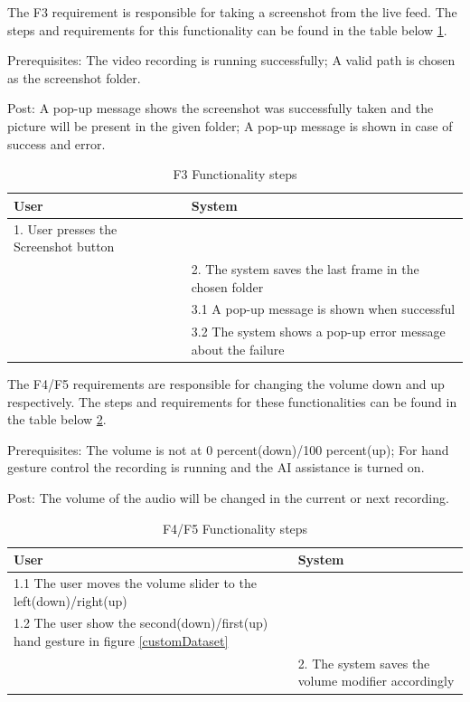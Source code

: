 \par The F3 requirement is responsible for taking a screenshot from the live feed. The steps and requirements for this functionality can be found in the table below \ref{F3Table}.
\par Prerequisites: The video recording is running successfully; A valid path is chosen as the screenshot folder.
\par Post: A pop-up message shows the screenshot was successfully taken and the picture will be present in the given folder; A pop-up message is shown in case of success and error.

\begin{table}[htbp]
\begin{center}
\begin{tabular}
{|p{180pt}|p{180pt}|}
\hline
 User & System\\
\hline 
\hline 1. User presses the Screenshot button &  \\
\hline  & 2. The system saves the last frame in the chosen folder \\
\hline  & 3.1 A pop-up message is shown when successful \\
\hline  & 3.2 The system shows a pop-up error message about the failure \\
\hline
\end{tabular}
\end{center}
\caption{F3 Functionality steps}
\label{F3Table}
\end{table}

\par The F4/F5 requirements are responsible for changing the volume down and up respectively. The steps and requirements for these functionalities can be found in the table below \ref{F5Table}.
\par Prerequisites: The volume is not at 0 percent(down)/100 percent(up); For hand gesture control the recording is running and the AI assistance is turned on.
\par Post: The volume of the audio will be changed in the current or next recording.

\begin{table}[htbp]
\begin{center}
\begin{tabular}
{|p{180pt}|p{180pt}|}
\hline
 User & System\\
\hline 
\hline 1.1 The user moves the volume slider to the left(down)/right(up) &  \\
\hline 1.2 The user show the second(down)/first(up) hand gesture in figure \ref{customDataset} &  \\
\hline  & 2. The system saves the volume modifier accordingly \\
\hline
\end{tabular}
\end{center}
\caption{F4/F5 Functionality steps}
\label{F5Table}
\end{table}

